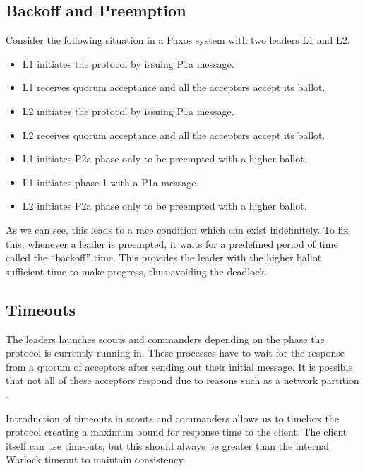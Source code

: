 \subsection{Backoff and Preemption}

Consider the following situation in a Paxos system with two leaders L1 and L2.

\begin{itemize}
  \item L1 initiates the protocol by issuing P1a message.
  \item L1 receives quorum acceptance and all the acceptors accept its ballot.
  \item L2 initiates the protocol by issuing P1a message.
  \item L2 receives quorum acceptance and all the acceptors accept its ballot.
  \item L1 initiates P2a phase only to be preempted with a higher ballot.
  \item L1 initiates phase 1 with a P1a message.
  \item L2 initiates P2a phase only to be preempted with a higher ballot.
\end{itemize}

As we can see, this leads to a race condition which can exist indefinitely. To
fix this, whenever a leader is preempted, it waits for a predefined period of
time called the ``backoff'' time. This provides the leader with the higher
ballot sufficient time to make progress, thus avoiding the deadlock.

\subsection{Timeouts}

The leaders launches scouts and commanders depending on the phase the protocol
is currently running in. These processes have to wait for the response from
a quorum of acceptors after sending out their initial message. It is possible
that not all of these acceptors respond due to reasons such as a network
partition%
.

Introduction of timeouts in scouts and commanders allows us to timebox the
protocol creating a maximum bound for response time to the client. The client
itself can use timeouts, but this should always be greater than the internal
Warlock timeout to maintain consistency.

